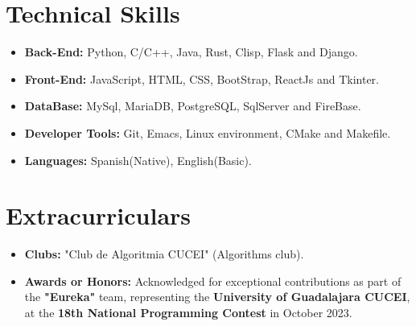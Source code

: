 \documentclass[11pt]{article}
\begin{document}
\vspace{-0.5cm}
\section*{Technical Skills}
\vspace{-0.3cm}
\titlerule[0.3pt]
\vspace{0.1cm}

\begin{itemize}[noitemsep, nolistsep]
\item \textbf{Back-End:} Python, C/C++, Java, Rust, Clisp, Flask and Django.
\item \textbf{Front-End:} JavaScript, HTML, CSS, BootStrap, ReactJs and Tkinter.
\item \textbf{DataBase:} MySql, MariaDB, PostgreSQL, SqlServer and FireBase.
\item \textbf{Developer Tools:} Git, Emacs, Linux environment, CMake and Makefile.
\item \textbf{Languages:} Spanish(Native), English(Basic).
\end{itemize}
\vspace{-0.5cm}

\section*{Extracurriculars}
\vspace{-0.3cm}
\titlerule[0.3pt]
\vspace{0.1cm}
\begin{itemize}[noitemsep, nolistsep]
\item \textbf{Clubs:} "Club de Algoritmia CUCEI" (Algorithms club).
\item \textbf{Awards or Honors:} Acknowledged for exceptional contributions as part of the \textbf{"Eureka"}
  team, representing the \textbf{University of Guadalajara CUCEI}, at the
  \textbf{18th National Programming Contest} in October 2023.
\end{itemize}
\end{document}

